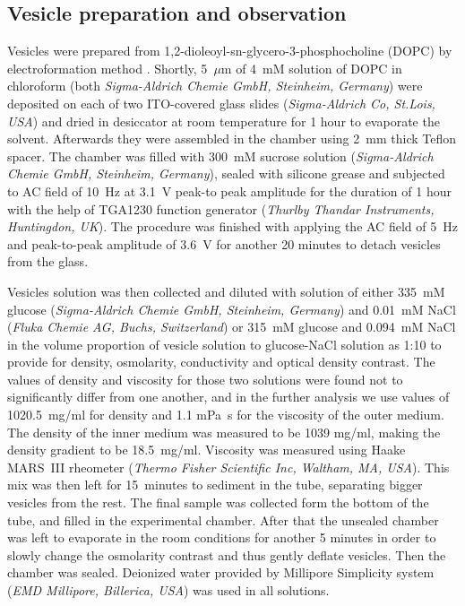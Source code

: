 \documentclass[10pt,a4paper]{article}
\begin{document}
\subsection{Vesicle preparation and observation}
Vesicles were prepared from 1,2-dioleoyl-sn-glycero-3-phosphocholine \newline (DOPC) by electroformation method \cite{Angelova1986}.
Shortly, 5~$\mu$m of 4~mM solution of DOPC in chloroform (both \emph{Sigma-Aldrich Chemie GmbH, Steinheim, Germany}) were deposited on each of two ITO-covered glass slides (\emph{Sigma-Aldrich Co, St.Lois, USA}) and dried in desiccator at room temperature for 1 hour to evaporate the solvent.
Afterwards they were assembled in the chamber using 2~mm thick Teflon spacer.
The chamber was filled with 300~mM sucrose solution (\emph{Sigma-Aldrich Chemie GmbH, Steinheim, Germany}), sealed with silicone grease and subjected to AC field of 10~Hz at 3.1~V peak-to peak amplitude for the duration of 1 hour with the help of TGA1230 function generator (\emph{Thurlby Thandar Instruments, Huntingdon, UK}).
The procedure was finished with applying the AC field of 5~Hz and peak-to-peak amplitude of 3.6~V for another 20 minutes to detach vesicles from the glass.

Vesicles solution was then collected and diluted with solution of either 335~mM glucose (\emph{Sigma-Aldrich Chemie GmbH, Steinheim, Germany}) and 0.01~mM NaCl (\emph{Fluka Chemie AG, Buchs, Switzerland}) or 315~mM glucose and 0.094~mM NaCl in the volume proportion of vesicle solution to glucose-NaCl solution as 1:10 to provide for density, osmolarity, conductivity and optical density contrast.
The values of density and viscosity for those two solutions were found not to significantly differ from one another, and in the further analysis we use values of 1020.5~mg/ml for density and 1.1 mPa~s for the viscosity of the outer medium.
The density of the inner medium was measured to be 1039 mg/ml, making the density gradient to be 18.5~mg/ml. Viscosity was measured using Haake MARS~III rheometer (\emph{Thermo Fisher Scientific Inc, Waltham, MA, USA}).
This mix was then left for 15~minutes to sediment in the tube, separating bigger vesicles from the rest.
The final sample was collected form the bottom of the tube, and filled in the experimental chamber.
After that the unsealed chamber was left to evaporate in the room conditions for another 5 minutes in order to slowly change the osmolarity contrast and thus gently deflate vesicles.
Then the chamber was sealed.
Deionized water provided by Millipore Simplicity system (\emph{EMD Millipore, Billerica, USA}) was used in all solutions.
\end{document}
